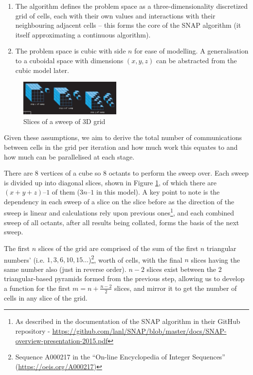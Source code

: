 \documentclass[conference]{IEEEtran}
\begin{document}
\begin{enumerate}

\item The algorithm defines the problem space as a three-dimensionality discretized grid of cells, each with their own values and interactions with their neighbouring adjacent cells – this forms the core of the SNAP algorithm (it itself approximating a continuous algorithm).

\item The problem space is cubic with side $ n $ for ease of modelling. A generalisation to a cuboidal space with dimensions $ (x, y, z) $ can be abstracted from the cubic model later.

\end{enumerate}

\begin{figure}
\centering
\includegraphics[width=0.45\textwidth]{Sweep.jpg}
\caption{Slices of a sweep of 3D grid}
\label{fig:3dsweepslice}
\end{figure}

Given these assumptions, we aim to derive the total number of communications between cells in the grid per iteration and how much work this equates to and how much can be parallelised at each stage.

There are $ 8 $ vertices of a cube so $ 8 $ octants to perform the sweep over. Each sweep is divided up into diagonal slices, shown in Figure \ref{fig:3dsweepslice}, of which there are $ (x + y + z) – 1 $ of them ($ 3n – 1 $ in this model). A key point to note is the dependency in each sweep of a slice on the slice before as the direction of the sweep is linear and calculations rely upon previous ones\footnote{As described in the documentation of the SNAP algorithm in their GitHub repository - \url{ https://github.com/lanl/SNAP/blob/master/docs/SNAP-overview-presentation-2015.pdf}}, and each combined sweep of all octants, after all results being collated, forms the basis of the next sweep.

The first $ n $ slices of the grid are comprised of the sum of the first $ n $ triangular numbers’ (i.e. $ 1, 3, 6, 10, 15… $)\footnote{Sequence A000217 in the ``On-line Encyclopedia of Integer Sequences'' (\url{https://oeis.org/A000217})}, worth of cells, with the final $ n $ slices having the same number also (just in reverse order). $ n - 2 $ slices exist between the 2 triangular-based pyramids formed from the previous step, allowing us to develop a function for the first $ m = n + \frac{n - 2}{2} $ slices, and mirror it to get the number of cells in any slice of the grid.
\end{document}
